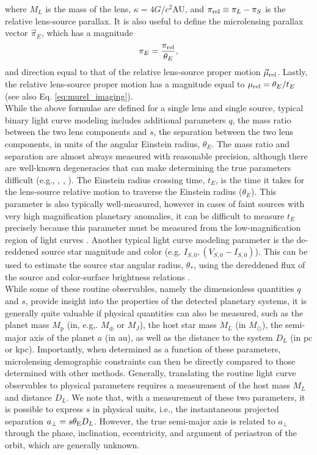 \documentclass[twocolumn]{aastex631}
\newcommand{\mpl}{M_{\mathrm{p}}}      %
\begin{document}
\noindent where $M_L$ is the mass of the lens, $\kappa = 4G/c^2$AU, and $\pi_{\rm rel} \equiv \pi_L - \pi_S$ is the relative lens-source parallax. It is also useful to define the microlensing parallax vector $\vec{\pi}_E$,  which has a magnitude 
\begin{equation}
    \pi_E = \frac{\pi_{\rm rel}}{\theta_E},
\end{equation}
and direction equal to that of the relative lens-source proper motion $\vec{\mu}_{\rm rel}$. Lastly, the relative lens-source proper motion has a magnitude equal to $\mu_{\rm rel} = \theta_E/t_E$ (see also Eq. \ref{eq:murel_imaging}).\\
\indent While the above formulae are defined for a single lens and single source, typical binary light curve modeling includes additional parameters $q$, the mass ratio between the two lens components and $s$, the separation between the two lens components, in units of the angular Einstein radius, $\theta_E$. The mass ratio and separation are almost always measured with reasonable precision, although there are well-known degeneracies that can make determining the true parameters difficult (e.g., \cite{dominik:1999a}, \cite{yee:2021a}, \cite{zhang:2022a}). The Einstein radius crossing time, $t_E$, is the time it takes for the lens-source relative motion to traverse the Einstein radius ($\theta_E$). This parameter is also typically well-measured, however in cases of faint sources with very high magnification planetary anomalies, it can be difficult to measure $t_E$ precisely because this parameter must be measured from the low-magnification region of light curves \citep{alard:1997a}. Another typical light curve modeling parameter is the de-reddened source star magnitude and color (e.g. $I_{S,0}, (V_{S,0}-I_{S,0})$). This can be used to estimate the source star angular radius, $\theta_*$, using the dereddened flux of the source and color-surface brightness relations \citep{kervella:2004a, boyajian:2014a, adams:2018a}. \\
\indent While some of these routine observables, namely the dimensionless quantities $q$ and $s$, provide insight into the properties of the detected planetary systems, it is generally quite valuable if physical quantities can also be measured, such as the planet mass $\mpl$ (in, e.g,. $M_\oplus$ or $M_J$), the host star mass $M_L$ (in $M_\odot$), the semi-major axis of the planet $a$ (in au), as well as the distance to the system $D_L$ (in pc or kpc). Importantly, when determined as a function of these parameters, microlensing demographic constraints can then be directly compared to those determined with other methods. Generally, translating the routine light curve observables to physical parameters requires a measurement of the host mass $M_L$ and distance $D_L$.  We note that, with a measurement of these two parameters, it is possible to express $s$ in physical units, i.e., the instantaneous projected separation $a_\perp= s \theta_{\rm E} D_L$.  However, the true semi-major axis is related to $a_\perp$ through the phase, inclination, eccentricity, and argument of periastron of the orbit, which are generally unknown.\\
\end{document}
